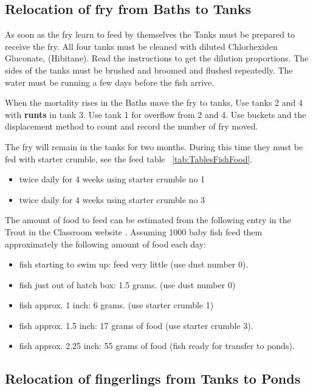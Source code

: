  \subsection{Relocation of fry from Baths to Tanks}
 
 As soon as the fry learn to feed by themselves the Tanks must be prepared to receive the fry.
 All four tanks must be cleaned with diluted Chlorhexiden Gluconate, (Hibitane). Read the 
 instructions to get the dilution proportions. 
 The sides of the tanks must be brushed and broomed and flushed repeatedly. 
 The water must be running a few days before the fish arrive. 
 \marginpar{6 \W}
 
 When the mortality rises in the Baths move the fry to tanks, 
 Use tanks 2 and 4 with {\bf runts} in tank 3.
 Use tank 1 for overflow from 2 and 4.
 Use buckets and the displacement method to count and record the number of fry moved.  
\marginpar{8 \W}

The fry will remain in the tanks for two months. During this time they must be fed with
 starter crumble, see the feed table ~\ref{tab:TablesFishFood}.

\begin{itemize}
          \item twice daily for 4 weeks using starter crumble no 1
          \item twice daily for 4 weeks using starter crumble no 3
\end{itemize} 

 The amount of food to feed can be estimated from the following entry in the 
 Trout in the Classroom website \cite{tic}.
 Assuming 1000 baby fish feed them approximately the following amount of food each day:

\begin{itemize}
\item fish starting to swim up: feed very little (use dust number 0).
\item fish just out of hatch box: 1.5 grams. (use dust number 0)
\item fish approx. 1 inch: 6 grams. (use starter crumble 1)
\item fish approx. 1.5 inch: 17 grams of food (use starter crumble 3).
\item fish approx. 2.25 inch: 55 grams of food (fish ready for transfer to ponds).
\end{itemize}


\subsection{Relocation of fingerlings from Tanks to Ponds}

